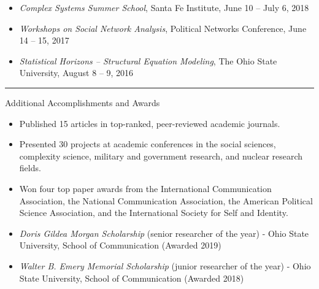 \documentclass[letterpaper, 9pt]{extarticle}
\begin{document}
{\begin{itemize}[leftmargin=!,labelindent=-10pt,itemindent=0pt]
\vspace{-6pt}
\item \textit{Complex Systems Summer School}, Santa Fe Institute, June 10 -- July 6, 2018

\vspace{-6pt}
\item \textit{Workshops on Social Network Analysis}, Political Networks Conference, June 14 -- 15, 2017

\vspace{-6pt}
\item \textit{Statistical Horizons -- Structural Equation Modeling}, The Ohio State University, August 8 -- 9, 2016
\end{itemize}

\vspace{-7.5pt}

\rule{\textwidth}{0.25pt}
\raggedright

\vspace{-4pt}
\begin{center}
\large{Additional Accomplishments and Awards}
\end{center}

\begin{itemize}[leftmargin=!,labelindent=-10pt,itemindent=0pt]
\item Published 15 articles in top-ranked, peer-reviewed academic journals.

\vspace{-6pt}
\item Presented 30 projects at academic conferences in the social sciences, complexity science, military and government research, and nuclear research fields.

\vspace{-6pt}
\item Won four top paper awards from the International Communication Association, the National Communication Association, the American Political Science Association, and the International Society for Self and Identity.

\vspace{-6pt}
\item \textit{Doris Gildea Morgan Scholarship} (senior researcher of the year) - Ohio State University, School of Communication (Awarded 2019)

\vspace{-6pt}
\item \textit{Walter B. Emery Memorial Scholarship} (junior researcher of the year) - Ohio State University, School of Communication (Awarded 2018)


\end{itemize}}
\end{document}
